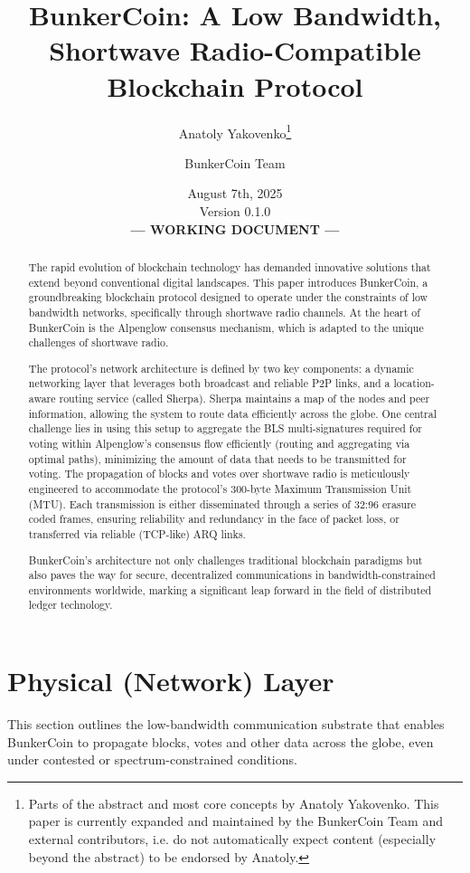 \documentclass{article}
\title{BunkerCoin: A Low Bandwidth, Shortwave Radio-Compatible Blockchain Protocol}
\author{Anatoly Yakovenko\thanks{Parts of the abstract and most core concepts by Anatoly Yakovenko. This paper is currently expanded and maintained by the BunkerCoin Team and external contributors, i.e. do not automatically expect content (especially beyond the abstract) to be endorsed by Anatoly.} \and BunkerCoin Team}
\date{August 7th, 2025\\Version 0.1.0 \\[1em] \textbf{--- WORKING DOCUMENT ---}}
\begin{document}
\maketitle

\begin{abstract}
The rapid evolution of blockchain technology has demanded innovative solutions that extend beyond conventional digital landscapes. This paper introduces BunkerCoin, a groundbreaking blockchain protocol designed to operate under the constraints of low bandwidth networks, specifically through shortwave radio channels. At the heart of BunkerCoin is the Alpenglow consensus mechanism, which is adapted to the unique challenges of shortwave radio.

The protocol's network architecture is defined by two key components: a dynamic networking layer that leverages both broadcast and reliable P2P links, and a location-aware routing service (called Sherpa). Sherpa maintains a map of the nodes and peer information, allowing the system to route data efficiently across the globe. One central challenge lies in using this setup to aggregate the BLS multi-signatures required for voting within Alpenglow's consensus flow efficiently (routing and aggregating via optimal paths), minimizing the amount of data that needs to be transmitted for voting. The propagation of blocks and votes over shortwave radio is meticulously engineered to accommodate the protocol's 300-byte Maximum Transmission Unit (MTU). Each transmission is either disseminated through a series of 32:96 erasure coded frames, ensuring reliability and redundancy in the face of packet loss, or transferred via reliable  (TCP-like) ARQ links.

BunkerCoin's architecture not only challenges traditional blockchain paradigms but also paves the way for secure, decentralized communications in bandwidth-constrained environments worldwide, marking a significant leap forward in the field of distributed ledger technology.
\end{abstract}

\section{Physical (Network) Layer}
\label{sec:physical}

This section outlines the low-bandwidth communication substrate that enables BunkerCoin to propagate blocks, votes and other data across the globe, even under contested or spectrum-constrained conditions.
\end{document}

